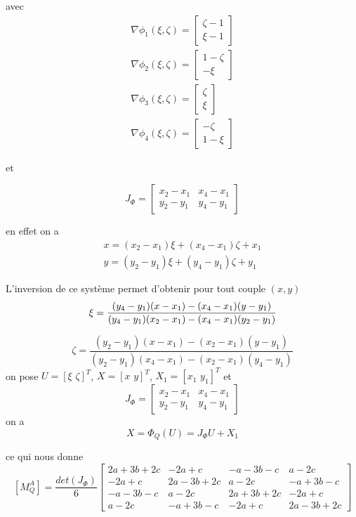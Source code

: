 \documentclass{article}
\begin{document}
avec 
\begin{gather*} 
    \nabla \phi_1(\xi, \zeta) = 
    \begin{bmatrix}
        \zeta - 1 \\
        \xi - 1
    \end{bmatrix} \\
    \nabla \phi_2(\xi, \zeta) = 
    \begin{bmatrix}
        1 - \zeta  \\
        - \xi
    \end{bmatrix} \\
    \nabla \phi_3(\xi, \zeta) = 
    \begin{bmatrix}
        \zeta  \\
        \xi
    \end{bmatrix} \\
    \nabla \phi_4(\xi, \zeta) = 
    \begin{bmatrix}
        -\zeta  \\
        1 - \xi
    \end{bmatrix}
\end{gather*}

et 

$$
J_{\Phi} = 
\begin{bmatrix}
    x_2 - x_1 & x_4 - x_1 \\
    y_2 - y_1 & y_4 - y_1
\end{bmatrix}
$$

en effet on a 
\begin{gather*}
    x = (x_2 - x_1) \xi + (x_4 - x_1) \zeta + x_1 \\
    y = (y_2 - y_1) \xi + (y_4 - y_1) \zeta + y_1
\end{gather*}

L'inversion de ce système permet d'obtenir pour tout couple $(x, y)$
$$
\xi = \frac{(y_4 - y_1)(x - x_1) - (x_4 - x_1)(y - y_1)}{(y_4 - y_1)(x_2 - x_1) - (x_4 - x_1)(y_2 - y_1)} \\
$$

$$
\zeta = \frac{(y_2 - y_1)(x - x_1) - (x_2 - x_1)(y - y_1)}{(y_2 - y_1)(x_4 - x_1) - (x_2 - x_1)(y_4 - y_1)}
$$
on pose $U = [\xi \, \, \zeta]^{T}$, $X = [x \, \, y]^{T}$, $X_1 = [x_1 \, \, y_1]^{T}$ et 
$$
J_{\Phi} = 
\begin{bmatrix}
    x_2 - x_1 & x_4 - x_1 \\
    y_2 - y_1 & y_4 - y_1
\end{bmatrix}
$$ on a 
$$
X = \Phi_Q(U) = J_{\Phi} U + X_1
$$

ce qui nous donne
$$
[M_{Q}^{A}] = \frac{det(J_{\Phi})}{6}
\begin{bmatrix}
    2a+3b+2c & -2a+c & -a-3b-c & a-2c \\
    -2a+c & 2a-3b+2c & a-2c & -a+3b-c \\
    -a-3b-c & a-2c & 2a+3b+2c & -2a+c \\
    a-2c & -a+3b-c & -2a+c & 2a-3b+2c 
\end{bmatrix}
$$
\end{document}
